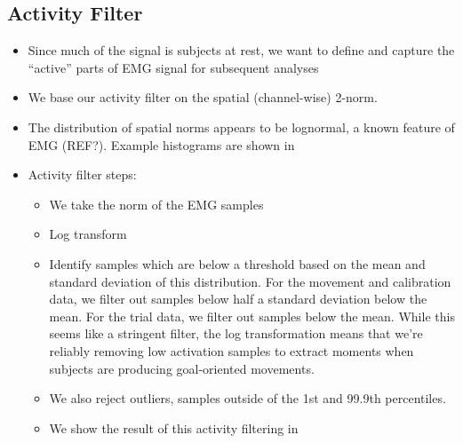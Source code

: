 \documentclass[../main.tex]{subfiles}
\begin{document}
\subsection{Activity Filter}

\begin{itemize}
  \item Since much of the signal is subjects at rest, we want to define and capture the ``active'' parts of EMG signal for subsequent analyses
  \item We base our activity filter on the spatial (channel-wise) 2-norm.
  \item The distribution of spatial norms appears to be lognormal, a known feature of EMG (REF?). Example histograms are shown in 
  \item Activity filter steps:
  \begin{itemize}
    \item We take the norm of the EMG samples
    \item Log transform
    \item Identify samples which are below a threshold based on the mean and standard deviation of this distribution. For the movement and calibration data, we filter out samples below half a standard deviation below the mean. For the trial data, we filter out samples below the mean. While this seems like a stringent filter, the log transformation means that we're reliably removing low activation samples to extract moments when subjects are producing goal-oriented movements.
    \item We also reject outliers, samples outside of the 1st and 99.9th percentiles.
    \item We show the result of this activity filtering in 
  \end{itemize}
\end{itemize}



\end{document}
